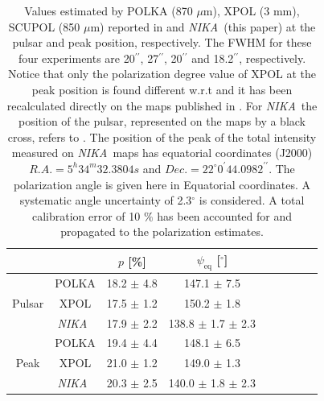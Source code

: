 \documentclass[twocolumn,traditabstract]{aa}
\def\NIKA{\textit{NIKA}}
\begin{document}
\begin{table}[h!]
  \centering
      \begin{tabular}{ccccccccc}
     &  & \small $p$ [\%] & \small $\psi_{\textrm{eq}}$ [$^\circ$] & \\ 
\hline
\hline
      &\small POLKA  & \small 18.2 $\pm$ \small 4.8 & \small 147.1 $\pm$ \small 7.5 & \\
      \small Pulsar &\small XPOL   & \small 17.5 $\pm$ \small 1.2 & \small 150.2 $\pm$ \small 1.8 &  \\
      &\small \NIKA\ & \small 17.9 $\pm$ \small 2.2 & \small 138.8 $\pm$ \small 1.7 $\pm$ \small 2.3 \\
      \hline

      &\small POLKA  & \small 19.4 $\pm$ \small 4.4 & \small 148.1 $\pm$ \small 6.5 &  \\
       \small Peak &\small XPOL  &  \small 21.0 $\pm$ 1.2 & \small 149.0 $\pm $ \small 1.3 &  \\
      &\small \NIKA\ & \small 20.3 $\pm$ \small 2.5 & \small 140.0 $\pm$ \small 1.8 $\pm$ \small 2.3 \\
             \hline
\hline
    \end{tabular}
   \caption{ Values estimated by POLKA (870 $\mu$m), XPOL (3 mm), SCUPOL (850 $\mu$m) reported in \cite{2014PASP..126.1027W} and \NIKA\ (this paper) at the pulsar and peak position, respectively. The FWHM for these four experiments are 20$^{\prime\prime}$, 27$^{\prime\prime}$, 20$^{\prime\prime}$ and 18.2$^{\prime\prime}$, respectively. Notice that only the polarization degree value of XPOL at the peak position is found different w.r.t \cite{2014PASP..126.1027W} and it has been recalculated directly on the maps published in \cite{aumont2010}. For \NIKA\ the position of the pulsar, represented on the maps by a black cross, refers to \cite{Lobanov}. The position of the peak of the total intensity measured on \NIKA\ maps has equatorial coordinates (J2000) $R.A. =5^h34^m32.3804s$ and $Dec. = 22^{\circ}0^{\prime}44.0982^{\prime\prime}$. The polarization angle is given here in Equatorial coordinates. A systematic angle uncertainty of 2.3$^{\circ}$ is considered. A total calibration error of 10 $\%$ has been accounted for and propagated 
to the polarization estimates.}
\label{tab:peak_pulsar_others}
 \end{table}
\end{document}
